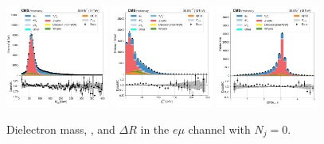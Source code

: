 \begin{figure}[htb!]
    \centering
    \includegraphics[width=0.3\textwidth]{chapters/Analysis/sectionPlots/figures/data_mc_overlays/emu_2016_cat_eq0_eq0_a_signal_linear_lepton_dilepton1_mass}
    \includegraphics[width=0.3\textwidth]{chapters/Analysis/sectionPlots/figures/data_mc_overlays/emu_2016_cat_eq0_eq0_a_signal_linear_lepton_dilepton1_pt}
    \includegraphics[width=0.3\textwidth]{chapters/Analysis/sectionPlots/figures/data_mc_overlays/emu_2016_cat_eq0_eq0_a_signal_linear_lepton_dilepton1_delta_r}
    \caption{Dielectron mass, \pt, and $\Delta R$ in the $e\mu$ channel
    with $N_{j} = 0$.}
    \label{fig:analysis:plots:emu_1_dilepton}
\end{figure}

